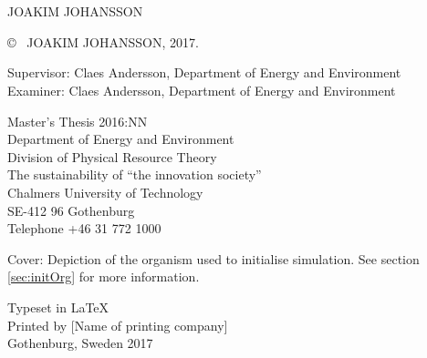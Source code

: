 \newpage
\thispagestyle{plain}
\vspace*{4.5cm}
\reportTitle{}\\
\reportSubTitle{}\\
JOAKIM JOHANSSON \setlength{\parskip}{1cm}

\copyright ~ JOAKIM JOHANSSON, 2017. \setlength{\parskip}{1cm}

Supervisor: Claes Andersson, Department of Energy and Environment\\
Examiner: Claes Andersson, Department of Energy and Environment\\
\setlength{\parskip}{1cm}

Master's Thesis 2016:NN\\	%
Department of Energy and Environment\\
Division of Physical Resource Theory\\
The sustainability of “the innovation society”\\
Chalmers University of Technology\\
SE-412 96 Gothenburg\\
Telephone +46 31 772 1000 \setlength{\parskip}{0.5cm}

\vfill
Cover: Depiction of the organism used to initialise simulation. See section \ref{sec:initOrg} for more information.\setlength{\parskip}{0.5cm}

Typeset in \LaTeX \\
Printed by [Name of printing company]\\
Gothenburg, Sweden 2017


